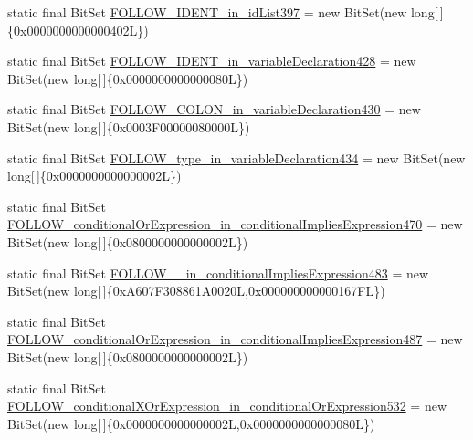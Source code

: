 \begin{DoxyCompactItemize}
\item 
static final Bit\-Set \hyperlink{classorg_1_1tzi_1_1use_1_1parser_1_1ocl_1_1_o_c_l_parser_a8a9adb86ede94928d92f628ef3f32563}{F\-O\-L\-L\-O\-W\-\_\-\-I\-D\-E\-N\-T\-\_\-in\-\_\-id\-List397} = new Bit\-Set(new long\mbox{[}$\,$\mbox{]}\{0x0000000000000402\-L\})
\item 
static final Bit\-Set \hyperlink{classorg_1_1tzi_1_1use_1_1parser_1_1ocl_1_1_o_c_l_parser_a545d5355c0fe3739b06e9c60c09500fc}{F\-O\-L\-L\-O\-W\-\_\-\-I\-D\-E\-N\-T\-\_\-in\-\_\-variable\-Declaration428} = new Bit\-Set(new long\mbox{[}$\,$\mbox{]}\{0x0000000000000080\-L\})
\item 
static final Bit\-Set \hyperlink{classorg_1_1tzi_1_1use_1_1parser_1_1ocl_1_1_o_c_l_parser_a0e091acf0ceaaca43f926530936147e0}{F\-O\-L\-L\-O\-W\-\_\-\-C\-O\-L\-O\-N\-\_\-in\-\_\-variable\-Declaration430} = new Bit\-Set(new long\mbox{[}$\,$\mbox{]}\{0x0003\-F00000080000\-L\})
\item 
static final Bit\-Set \hyperlink{classorg_1_1tzi_1_1use_1_1parser_1_1ocl_1_1_o_c_l_parser_aeced95b146b31dba87c24aeddf62f378}{F\-O\-L\-L\-O\-W\-\_\-type\-\_\-in\-\_\-variable\-Declaration434} = new Bit\-Set(new long\mbox{[}$\,$\mbox{]}\{0x0000000000000002\-L\})
\item 
static final Bit\-Set \hyperlink{classorg_1_1tzi_1_1use_1_1parser_1_1ocl_1_1_o_c_l_parser_a2282b22cfdfa66d5fee7f283c6fe3736}{F\-O\-L\-L\-O\-W\-\_\-conditional\-Or\-Expression\-\_\-in\-\_\-conditional\-Implies\-Expression470} = new Bit\-Set(new long\mbox{[}$\,$\mbox{]}\{0x0800000000000002\-L\})
\item 
static final Bit\-Set \hyperlink{classorg_1_1tzi_1_1use_1_1parser_1_1ocl_1_1_o_c_l_parser_a861345fa31ef3d94e26bc0ec120eef4d}{F\-O\-L\-L\-O\-W\-\_\-\_\-in\-\_\-conditional\-Implies\-Expression483} = new Bit\-Set(new long\mbox{[}$\,$\mbox{]}\{0x\-A607\-F308861\-A0020\-L,0x000000000000167\-F\-L\})
\item 
static final Bit\-Set \hyperlink{classorg_1_1tzi_1_1use_1_1parser_1_1ocl_1_1_o_c_l_parser_aafafc6f31f909087dd8f606705976cc4}{F\-O\-L\-L\-O\-W\-\_\-conditional\-Or\-Expression\-\_\-in\-\_\-conditional\-Implies\-Expression487} = new Bit\-Set(new long\mbox{[}$\,$\mbox{]}\{0x0800000000000002\-L\})
\item 
static final Bit\-Set \hyperlink{classorg_1_1tzi_1_1use_1_1parser_1_1ocl_1_1_o_c_l_parser_a7e9c812e2d5a50226a3ec6343d0bde38}{F\-O\-L\-L\-O\-W\-\_\-conditional\-X\-Or\-Expression\-\_\-in\-\_\-conditional\-Or\-Expression532} = new Bit\-Set(new long\mbox{[}$\,$\mbox{]}\{0x0000000000000002\-L,0x0000000000000080\-L\})

\end{DoxyCompactItemize}
